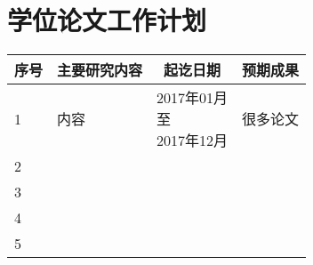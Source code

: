 



\section{学位论文工作计划}
{
\noindent
\begin{tabular*}{0.999\textwidth}{| p{ } <{\centering} | p{}  | p{} | p{}  |}

	\hline 
	序号 & 	\multicolumn{1}{c}{主要研究内容} & 	\multicolumn{1}{|c}{起讫日期} & 	\multicolumn{1}{|c|}{预期成果} \\
	\hline 
	1  &  内容 &  \tabincell{c}{2017年01月 \\至 \\2017年12月} & 很多论文 \\ 
	\hline 
	2   &  &  &  \\ 
	\hline 
	3    &  &  &  \\ 
	\hline 
	4    &  &  &  \\ 
	\hline 
	5    &  &  &  \\ 
	\hline 
\end{tabular*} 
\indent
}


